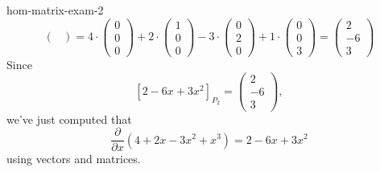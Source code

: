 \begin{example}{}{hom-matrix-exam-2}
\[\begin{pmatrix}
  \end{pmatrix}
  = 4 \cdot 
  \begin{pmatrix}
   0\\0\\0
  \end{pmatrix}
  + 2 \cdot 
  \begin{pmatrix}
   1\\0\\0
  \end{pmatrix}
  -3 \cdot 
  \begin{pmatrix}
   0\\
   2\\
   0
  \end{pmatrix}
  + 1 \cdot 
  \begin{pmatrix}
   0\\
   0\\
   3
  \end{pmatrix}
  = 
  \begin{pmatrix}
   2\\-6\\3
  \end{pmatrix}
 \]
 Since
 \[
  [2 - 6x + 3x^2]_{P_2} = 
  \begin{pmatrix}
   2\\
   -6\\
   3
  \end{pmatrix},
 \]
 we've just computed that
 \[
  \frac{\partial}{\partial x}(4 + 2x - 3x^2 + x^3) = 2 - 6x + 3x^2
 \]
 using vectors and matrices.
\end{example}

